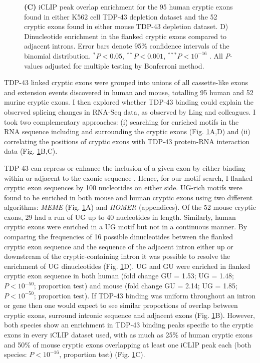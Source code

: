 \begin{figure}[h!]
{	\textbf{(C)} iCLIP peak overlap enrichment for the 95 human cryptic exons found in either K562 cell TDP-43 depletion dataset and the 52 cryptic exons found in either mouse TDP-43 depletion dataset. D) Dinucleotide enrichment in the flanked cryptic exons compared to adjacent introns. Error bars denote 95\% confidence intervals of the binomial distribution. $^* P < 0.05 $, $^{**} P < 0.001$, $^{***} P < 10^{-16}$ . All \textit{P}-values adjusted for multiple testing by Bonferroni method.
}
	\label{fig:cryptic_motifs}
\end{figure}


TDP-43 linked cryptic exons were grouped into unions of all cassette-like exons and extension events discovered in human and mouse, totalling 95 human and 52 murine cryptic exons. I then explored whether TDP-43 binding could explain the observed splicing changes in RNA-Seq data, as observed by Ling and colleagues. I took two complementary approaches: (i) searching for enriched motifs in the RNA sequence including and surrounding the cryptic exons (Fig. \ref{fig:cryptic_motifs}A,D) and (ii) correlating the positions of cryptic exons with TDP-43 protein-RNA interaction data (Fig. \ref{fig:cryptic_motifs}B,C).

TDP-43 can repress or enhance the inclusion of a given exon by either binding within or adjacent to the exonic sequence \citep{Tollervey2011}. Hence, for our motif search, I flanked cryptic exon sequences by 100 nucleotides on either side. UG-rich motifs were found to be enriched in both mouse and human cryptic exons using two different algorithms: \emph{MEME} (Fig. \ref{fig:cryptic_motifs}A) and \emph{HOMER} (appendices). Of the 52 mouse cryptic exons, 29 had a run of UG up to 40 nucleotides in length. Similarly, human cryptic exons were enriched in a UG motif but not in a continuous manner. By comparing  the frequencies of  16 possible dinucleotides between the flanked cryptic exon sequence and the sequence of the adjacent intron either up or downstream of the cryptic-containing intron it was possible to resolve the enrichment of UG dinucleotides (Fig. \ref{fig:cryptic_motifs}D). UG and GU were enriched in flanked cryptic exon sequence in both human (fold change GU = 1.53; UG = 1.48; $P < 10^{-50}$; proportion test) and mouse (fold change GU = 2.14; UG = 1.85; $P < 10^{-50}$; proportion test). 
If TDP-43 binding was uniform throughout an intron or gene then one would expect to see similar proportions of overlap between cryptic exons, surround intronic sequence and adjacent exons (Fig. \ref{fig:cryptic_motifs}B). However, both species show an enrichment in TDP-43 binding peaks specific to the cryptic exons in every iCLIP dataset used, with as much as 25\% of human cryptic exons and 50\% of mouse cryptic exons overlapping at least one iCLIP peak each (both species: $P < 10^{-16}$, proportion test) (Fig. \ref{fig:cryptic_motifs}C). 



